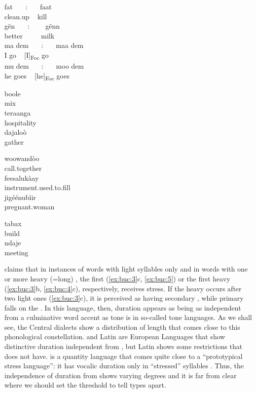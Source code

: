 \documentclass[output=paper]{LSP/langsci}
\begin{document}
\ea
    \label{ex:buc:2}
  \ea
  \gll fat~~~ :~~~ faat  \\
    clean.up ~ kill \\  
  \ex
    gën~~~ :~~~~ gënn\\
    better ~~~~ milk\\
  \ex
  \gll ma dem~~~ :~~~ maa dem                   \\
	I go ~ [I]\textsubscript{Foc} go    \\
  \ex
  \gll mu dem~~~  :~~~ moo dem\\
      he goes  ~  [he]\textsubscript{Foc} goes\\
     
  \z
\z


\ea%
    \label{ex:buc:3}
  \ea
  \gll {}boole\\
  mix\\
  \ex
  \gll teraanga \\
  hospitality\\
  \ex
  \gll {}dajaloò\\
  gather\\
  \z
\z

\ea%
    \label{ex:buc:4}
    \ea
    \gll{}woowandòo  \\
    call.together  \\
    \ex 
    \gll {}feesalukàay   \\
    instrument.used.to.fill\\
    \ex
    \gll jigéénubìir \\
   pregnant.woman \\
\z
\z

\ea%
    \label{ex:buc:5}
    \ea
    \gll {}tabax \\
	build \\
    \ex
    \gll {}ndaje\\
    meeting  \\
    \z 
\z 

\citet{Ka1989,Ka1994} claims that in instances of words with light syllables only and in words with one or more heavy (=long) , the first (\ref{ex:buc:3}c, \ref{ex:buc:5}) or the first heavy  (\ref{ex:buc:3}b, \ref{ex:buc:4}c), respectively, receives stress. If the heavy  occurs after two light ones (\ref{ex:buc:3}c), it is perceived as having secondary , while primary  falls on the . In this language, then, duration appears as being as independent from a culminative word accent as tone is in so-called tone languages. As we shall see, the Central  dialects show a distribution of length that comes close to this phonological constellation.  and Latin are European Languages that show distinctive duration independent from , but Latin shows some restrictions that  does not have.  is a quantity language that comes quite close to a ``prototypical stress  language'': it has vocalic duration only in ``stressed'' syllables \citep{Becker1996}. Thus, the independence of duration from  shows varying degrees and it is far from clear where we should set the threshold to tell types apart.
\end{document}

